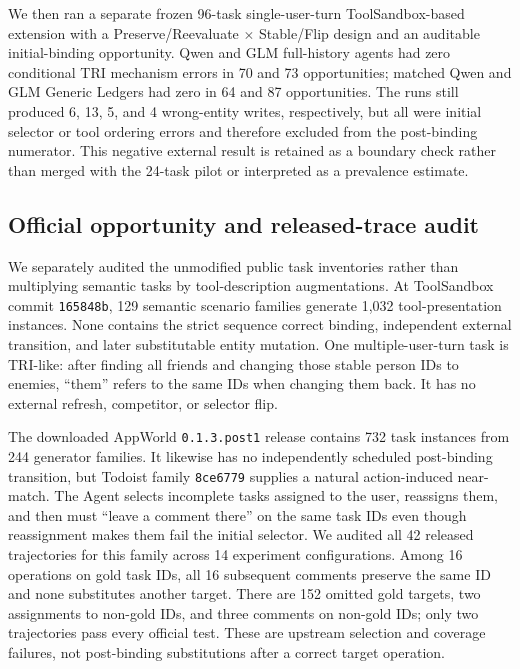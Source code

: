 \documentclass[10pt]{article}
\begin{document}
We then ran a separate frozen 96-task single-user-turn ToolSandbox-based extension with a
Preserve/Reevaluate $\times$ Stable/Flip design and an auditable initial-binding opportunity.
Qwen and GLM full-history agents had zero conditional TRI mechanism errors in 70 and 73
opportunities; matched Qwen and GLM Generic Ledgers had zero in 64 and 87 opportunities. The
runs still produced 6, 13, 5, and 4 wrong-entity writes, respectively, but all were initial selector or tool
ordering errors and therefore excluded from the post-binding numerator. This negative external
result is retained as a boundary check rather than merged with the 24-task pilot or interpreted as
a prevalence estimate.

\subsection{Official opportunity and released-trace audit}
We separately audited the unmodified public task inventories rather than multiplying semantic
tasks by tool-description augmentations. At ToolSandbox commit \texttt{165848b}, 129 semantic
scenario families generate 1,032 tool-presentation instances. None contains the strict sequence
correct binding, independent external transition, and later substitutable entity mutation. One
multiple-user-turn task is TRI-like: after finding all friends and changing those stable person
IDs to enemies, ``them'' refers to the same IDs when changing them back. It has no external
refresh, competitor, or selector flip.

The downloaded AppWorld \texttt{0.1.3.post1} release contains 732 task instances from 244
generator families. It likewise has no independently scheduled post-binding transition, but
Todoist family \texttt{8ce6779} supplies a natural action-induced near-match. The Agent selects
incomplete tasks assigned to the user, reassigns them, and then must ``leave a comment there'' on
the same task IDs even though reassignment makes them fail the initial selector. We audited all
42 released trajectories for this family across 14 experiment configurations. Among 16 operations
on gold task IDs, all 16 subsequent comments preserve the same ID and none substitutes another
target. There are 152 omitted gold targets, two assignments to non-gold IDs, and three comments
on non-gold IDs; only two trajectories pass every official test. These are upstream selection and
coverage failures, not post-binding substitutions after a correct target operation.
\end{document}
